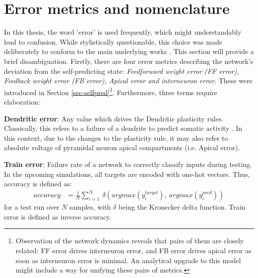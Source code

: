 \section{Error metrics and nomenclature}

In this thesis, the word 'error' is used frequently, which might understandably lead to confusion. While stylistically
questionable, this choice was made deliberately to conform to the main underlying works
\citep{urbanczik2014learning,sacramento2018dendritic,whittington2019theories,Haider2021}. This section will provide a
brief disambiguation. Firstly, there are four error metrics describing the network's deviation from the self-predicting
state: \textit{Feedforward weight error (FF error), Feedback weight error (FB error), Apical error and interneuron
error}. These were introduced in Section \ref{sec-selfpred}\footnote{Observation of the network dynamics reveals that
pairs of them are closely related: FF error drives interneuron error, and FB error drives apical error as soon as
interneuron error is minimal. An analytical upgrade to this model might include a way for unifying these pairs of
metrics.}. Furthermore, three terms require elaboration:\newline

\textbf{Dendritic error}: Any value which drives the Dendritic plasticity rules. Classically, this refers to a failure
of a dendrite to predict somatic activity \citep{urbanczik2014learning}. In this context, due to the changes to the
plasticity rule, it may also refer to absolute voltage of pyramidal neuron apical compartments (i.e. Apical error).
\newline

\textbf{Train error}: Failure rate of a network to correctly classify inputs during testing. In the upcoming
simulations, all targets are encoded with one-hot vectors. Thus, accuracy is defined as:
\begin{align*}
  accuracy & = \frac{1}{N} \sum_{i=1}^N \  \delta \left(argmax(y^{target}_i),\ argmax(y^{pred}_i) \right)
\end{align*}
for a test run over $N$ samples, with $\delta$ being the Kronecker delta function. Train error is defined as inverse
accuracy.\newline

